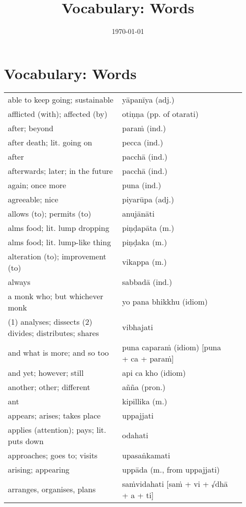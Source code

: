 \documentclass[a5paper]{memoir}
\date{\today}
\title{Vocabulary: Words}
\begin{document}
\chapter{Vocabulary: Words}
\label{sec:orgf511f38}

\begin{longtable}{L{0.48\linewidth} L{0.48\linewidth} H}
able to keep going; sustainable & yāpanīya (adj.) & \\[0pt]
afflicted (with); affected (by) & otiṇṇa (pp. of otarati) & \\[0pt]
after; beyond & paraṁ (ind.) & \\[0pt]
after death; lit. going on & pecca (ind.) & \\[0pt]
after & pacchā (ind.) & \\[0pt]
afterwards; later; in the future & pacchā (ind.) & \\[0pt]
again; once more & puna (ind.) & \\[0pt]
agreeable; nice & piyarūpa (adj.) & \\[0pt]
allows (to); permits (to) & anujānāti & \\[0pt]
alms food; lit. lump dropping & piṇḍapāta (m.) & \\[0pt]
alms food; lit. lump-like thing & piṇḍaka (m.) & \\[0pt]
alteration (to); improvement (to) & vikappa (m.) & \\[0pt]
always & sabbadā (ind.) & \\[0pt]
a monk who; but whichever monk & yo pana bhikkhu (idiom) & \\[0pt]
(1) analyses; dissects (2) divides; distributes; shares & vibhajati & \\[0pt]
and what is more; and so too & puna caparaṁ (idiom) [puna + ca + paraṁ] & \\[0pt]
and yet; however; still & api ca kho (idiom) & \\[0pt]
another; other; different & añña (pron.) & \\[0pt]
ant & kipillika (m.) & \\[0pt]
appears; arises; takes place & uppajjati & \\[0pt]
applies (attention); pays; lit. puts down & odahati & \\[0pt]
approaches; goes to; visits & upasaṅkamati & \\[0pt]
arising; appearing & uppāda (m., from uppajjati) & \\[0pt]
arranges, organises, plans & saṁvidahati [saṁ + vi + √dhā + a + ti] & \\[0pt]

\end{longtable}
\end{document}
